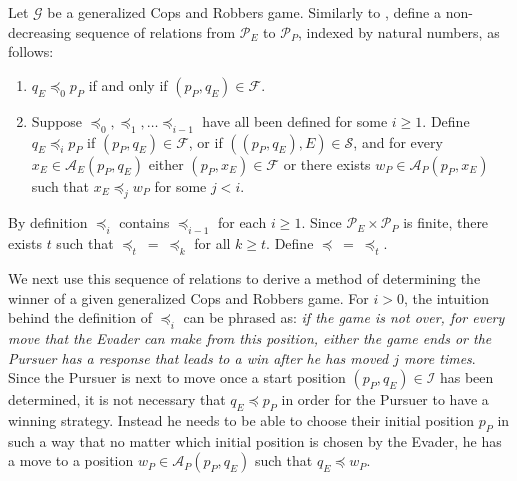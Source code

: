 \documentclass[12pt,reqno]{amsart}
\begin{document}
Let $\mathcal{G}$ be a generalized Cops and Robbers game.  Similarly to \cite{cm,NW}, define a non-decreasing sequence of relations from $\mathcal{P}_E$ to $\mathcal{P}_P$, indexed by natural
numbers, as follows:
\begin{enumerate}
\item $q_E \preceq_0 p_P$ if and only if $(p_P, q_E) \in \mathcal{F}$.
\item Suppose $\preceq_0, \preceq_1, \ldots \preceq_{i-1}$ have all been defined for some $i \geq 1$.  Define $q_E \preceq_i p_P$ if $(p_P, q_E) \in \mathcal{F}$, or if $((p_P, q_E), E) \in
    \mathcal{S}$,  and for every $x_E \in \mathcal{A}_E(p_P, q_E)$ either $(p_P, x_E) \in \mathcal{F}$ or there exists $w_P \in \mathcal{A}_P(p_P, x_E)$ such that  $x_E \preceq_j  w_P$ for some $j
    < i$.
\end{enumerate}
By definition $\preceq_{i}$ contains $\preceq_{i-1}$ for each $i \geq 1$.  Since $\mathcal{P}_E \times \mathcal{P}_P$ is finite, there exists $t$ such that $\preceq_t\ =\ \preceq_k$ for all $k \geq
t$.  Define $\preceq\ =\ \preceq_t$.

We next use this sequence of relations to derive a method of determining the winner of a given generalized Cops and Robbers game.  For $i > 0$, the intuition behind the definition of $\preceq_i$ can
be phrased as: \emph{if the game is not over, for every move that the Evader can make from this position, either the game ends or the Pursuer has a response that leads to a win after he has moved $j$
more times}. Since the Pursuer is next to move once a start position $(p_P, q_E) \in \mathcal{I}$ has been determined, it is not necessary that $q_E \preceq p_P$ in order for the Pursuer to have a
winning strategy. Instead he needs to be able to choose their initial position $p_P$ in such a way that no matter which initial position is chosen by the Evader, he has a move to a position $w_P \in
\mathcal{A}_P(p_P, q_E)$ such that $q_E \preceq w_P$.
\end{document}
